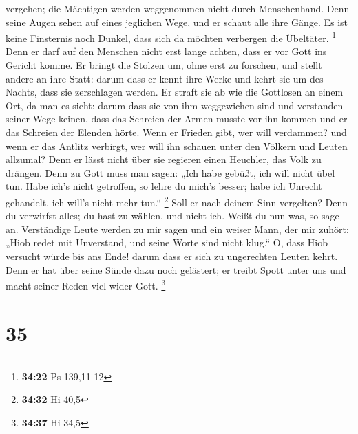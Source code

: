 vergehen; die Mächtigen werden weggenommen nicht durch Menschenhand.
 Denn seine Augen sehen auf eines jeglichen Wege, und er
schaut alle ihre Gänge.  Es ist keine Finsternis noch
Dunkel, dass sich da möchten verbergen die Übeltäter. \footnote{\textbf{34:22}
  Ps 139,11-12}  Denn er darf auf den Menschen nicht erst
lange achten, dass er vor Gott ins Gericht komme.  Er
bringt die Stolzen um, ohne erst zu forschen, und stellt andere an ihre
Statt:  darum dass er kennt ihre Werke und kehrt sie um des
Nachts, dass sie zerschlagen werden.  Er straft sie ab wie
die Gottlosen an einem Ort, da man es sieht:  darum dass
sie von ihm weggewichen sind und verstanden seiner Wege keinen,
 dass das Schreien der Armen musste vor ihn kommen und er
das Schreien der Elenden hörte.  Wenn er Frieden gibt, wer
will verdammen? und wenn er das Antlitz verbirgt, wer will ihn schauen
unter den Völkern und Leuten allzumal?  Denn er lässt nicht
über sie regieren einen Heuchler, das Volk zu drängen. 
Denn zu Gott muss man sagen: „Ich habe gebüßt, ich will nicht übel tun.
 Habe ich's nicht getroffen, so lehre du mich's besser;
habe ich Unrecht gehandelt, ich will's nicht mehr tun.`` \footnote{\textbf{34:32}
  Hi 40,5}  Soll er nach deinem Sinn vergelten? Denn du
verwirfst alles; du hast zu wählen, und nicht ich. Weißt du nun was, so
sage an.  Verständige Leute werden zu mir sagen und ein
weiser Mann, der mir zuhört:  „Hiob redet mit Unverstand,
und seine Worte sind nicht klug.``  O, dass Hiob versucht
würde bis ans Ende! darum dass er sich zu ungerechten Leuten kehrt.
 Denn er hat über seine Sünde dazu noch gelästert; er
treibt Spott unter uns und macht seiner Reden viel wider Gott.
\footnote{\textbf{34:37} Hi 34,5}

\hypertarget{section-8}{%
\section{35}\label{section-8}}

